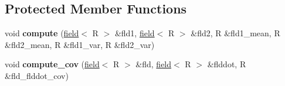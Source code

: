 \subsection*{Protected Member Functions}
\begin{DoxyCompactItemize}
\item 
\hypertarget{classstats__outputter_af586161d6085407cffd6ffd35f674ad8}{
void {\bfseries compute} (\hyperlink{classfield}{field}$<$ R $>$ \&fld1, \hyperlink{classfield}{field}$<$ R $>$ \&fld2, R \&fld1\_\-mean, R \&fld2\_\-mean, R \&fld1\_\-var, R \&fld2\_\-var)}
\label{classstats__outputter_af586161d6085407cffd6ffd35f674ad8}

\item 
\hypertarget{classstats__outputter_a01cb22821bb0f8fb9179c6c94260955d}{
void {\bfseries compute\_\-cov} (\hyperlink{classfield}{field}$<$ R $>$ \&fld, \hyperlink{classfield}{field}$<$ R $>$ \&flddot, R \&fld\_\-flddot\_\-cov)}
\label{classstats__outputter_a01cb22821bb0f8fb9179c6c94260955d}

\end{DoxyCompactItemize}
